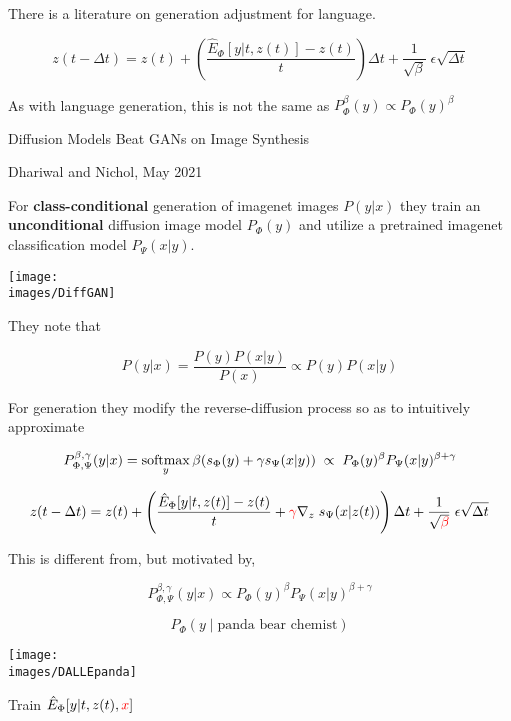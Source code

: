 {\vfill
There is a literature on generation adjustment for language.


{\huge

$$z(t - \Delta t) = z(t) + \left(\frac{\hat{E}_\Phi[y|t,z(t)] - z(t)}{t}\right)\Delta t + \frac{1}{\sqrt{\beta}}\;\epsilon\sqrt{\Delta t}$$

\vfill
As with language generation, this is not the same as $P^\beta_\Phi(y) \propto P_\Phi(y)^\beta$
}


\centerline{Diffusion Models Beat GANs on Image Synthesis}
\centerline{Dhariwal and Nichol, May 2021}

\vfill
For {\bf class-conditional} generation of imagenet images $P(y|x)$ they train an {\bf unconditional} diffusion image model $P_\Phi(y)$
and utilize a pretrained imagenet classification model $P_\Psi(x|y)$.

\vfill
\centerline{\texttt{[image: \\images/DiffGAN]}}


They note that

\vfill
$$P(y|x) = \frac{P(y)P(x|y)}{P(x)} \propto P(y)P(x|y)$$

\vfill
For generation they modify the reverse-diffusion process so as to intuitively approximate

$$P^{\beta,\gamma}_{\Phi,\Psi}(y|x) = \operatorname*{softmax}_y \beta(s_\Phi(y)+ \gamma s_\Psi(x|y)) \; \propto \;P_\Phi(y)^\beta P_\Psi(x|y)^{\beta + \gamma}$$


{\huge $$z(t - \Delta t) = z(t) + \left(\frac{\hat{E}_\Phi[y|t,z(t)] - z(t)}{t} + {\color{red} \gamma} \nabla_z\;s_\Psi(x|z(t))\right)\Delta t
+ \frac{1}{\sqrt{\color{red} \beta}}\;\epsilon\sqrt{\Delta t}$$}

\vfill
This is different from, but motivated by,

\vfill
$$P^{\beta,\gamma}_{\Phi,\Psi}(y|x) \propto P_\Phi(y)^\beta P_\Psi(x|y)^{\beta + \gamma}$$


$$P_\Phi(y\;|\;\mbox{panda bear chemist})$$

\vfill
\centerline{\texttt{[image: \\images/DALLEpanda]}}

\vfill
\centerline {Train $\hat{E}_\Phi[y|t,z(t),{\color{red} x}]$}

}
